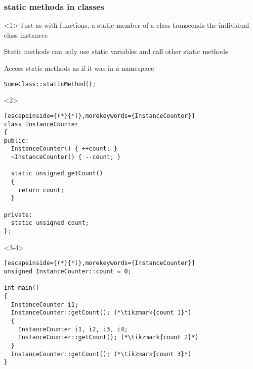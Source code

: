 \documentclass[14pt,a4paper,dvipsnames,usenames]{beamer}
\begin{document}
\begin{frame}[fragile]
  \frametitle{{\color{FeebleWeek}static} methods in classes}

  \begin{onlyenv}<1>
    Just as with functions, a static member of a class transcends the individual class instances
    
    \vspace{1em}
    Static methods can only use static variables and call other static methods
    
    \vspace{1em}
    Access static methods as if it was in a namespace

    \vspace{.5em}
    \begin{lstlisting}[morekeywords={SomeClass},basicstyle=\ttfamily]
SomeClass::staticMethod();
    \end{lstlisting}
  \end{onlyenv}

  \begin{onlyenv}<2>
  \begin{lstlisting}[escapeinside={(*}{*)},morekeywords={InstanceCounter}]
class InstanceCounter
{
public:
  InstanceCounter() { ++count; }
  ~InstanceCounter() { --count; }

  static unsigned getCount()
  {
    return count;
  }

private:
  static unsigned count;
};
  \end{lstlisting}
  \end{onlyenv}

  \begin{onlyenv}<3-4>
  \begin{lstlisting}[escapeinside={(*}{*)},morekeywords={InstanceCounter}]
unsigned InstanceCounter::count = 0;

int main()
{
  InstanceCounter i1;
  InstanceCounter::getCount(); (*\tikzmark{count 1}*)
  {
    InstanceCounter i1, i2, i3, i4;
    InstanceCounter::getCount(); (*\tikzmark{count 2}*)
  }
  InstanceCounter::getCount(); (*\tikzmark{count 3}*)
}
  \end{lstlisting}


  \end{onlyenv}
  
\end{frame}
\end{document}
